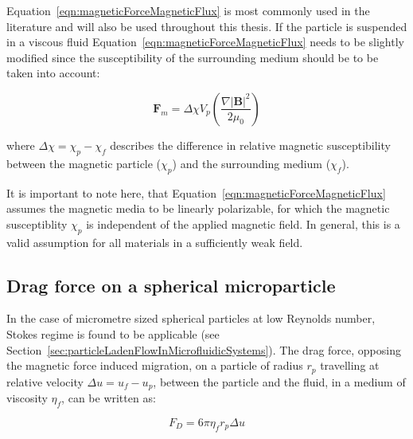 Equation~\ref{eqn:magneticForceMagneticFlux} is most commonly used in the literature and will also be used throughout this thesis. If the particle is suspended in a viscous fluid Equation~\ref{eqn:magneticForceMagneticFlux} needs to be slightly modified since the susceptibility of the surrounding medium should be to be taken into account:

\begin{equation}
	\mathbf{F}_{m} = \Delta \chi V_{p} \left(\frac{\nabla |\mathbf{B}|^{2}}{2\mu_{0}}\right)
	\label{eqn:magneticForceFluid}
\end{equation}

where $\Delta \chi = \chi_{p}-\chi_{f}$ describes the difference in relative magnetic susceptibility between the magnetic particle ($\chi_{p}$) and the surrounding medium ($\chi_{f}$).

It is important to note here, that Equation~\ref{eqn:magneticForceMagneticFlux} assumes the magnetic media to be linearly polarizable, for which the magnetic susceptiblity $\chi_{p}$ is independent of the applied magnetic field. In general, this is a valid assumption for all materials in a sufficiently weak field. 

\subsection{Drag force on a spherical microparticle}
In the case of micrometre sized spherical particles at low Reynolds number, Stokes regime is found to be applicable (see Section~\ref{sec:particleLadenFlowInMicrofluidicSystems}). The drag force, opposing the magnetic force induced migration, on a particle of radius $r_{p}$ travelling at relative velocity $\Delta u = u_{f}-u_{p}$, between the particle and the fluid, in a medium of viscosity $\eta_{f}$, can be written as:

\begin{equation}
	F_{D} = 6\pi\eta_{f} r_{p} \Delta u
	\label{eqn:dragForceOnParticle}
\end{equation}



